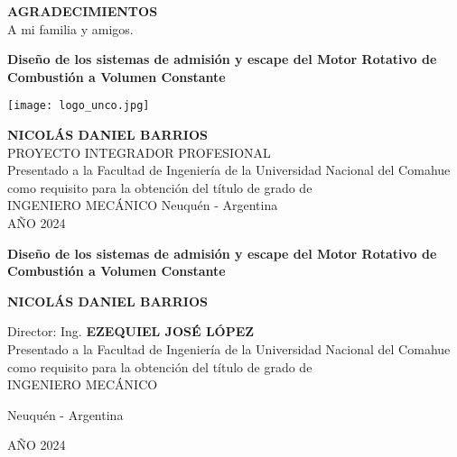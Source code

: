 \newpage
\thispagestyle{plain}

\begin{center}

\textbf{AGRADECIMIENTOS}\\
\vspace{1cm}
A mi familia y amigos.

\end{center}


\begin{center}
\Large\textbf{{Diseño de los sistemas de admisión y escape del Motor Rotativo
    de Combustión a Volumen Constante\\}}

\vspace{2cm}

\texttt{[image: logo\_unco.jpg]}\\

\vspace{1cm}

\Large{\textbf{ NICOLÁS DANIEL BARRIOS\\ }}
\vspace{1cm}
PROYECTO INTEGRADOR PROFESIONAL\\
\vspace{1cm}
Presentado a la Facultad de Ingeniería de la Universidad Nacional del Comahue
como requisito para la obtención del título de grado de \\ INGENIERO MECÁNICO
\vspace{1cm}
Neuquén - Argentina\\
AÑO 2024
\vspace{1cm}
\end{center}

\pagebreak

\begin{center}

\Large\textbf{{Diseño de los sistemas de admisión y escape del Motor Rotativo
de Combustión a Volumen Constante\\}}

\vspace{4cm}

\large{\textbf{
NICOLÁS DANIEL BARRIOS\\
}}

\vspace{3cm}
Director: Ing.  \textbf{EZEQUIEL JOSÉ LÓPEZ}\\

\vspace{3cm}
%
Presentado a la Facultad de Ingeniería de la Universidad Nacional del Comahue
como requisito para la obtención del título de grado de \\ INGENIERO MECÁNICO

\vfill
Neuquén - Argentina

AÑO 2024
\end{center}

